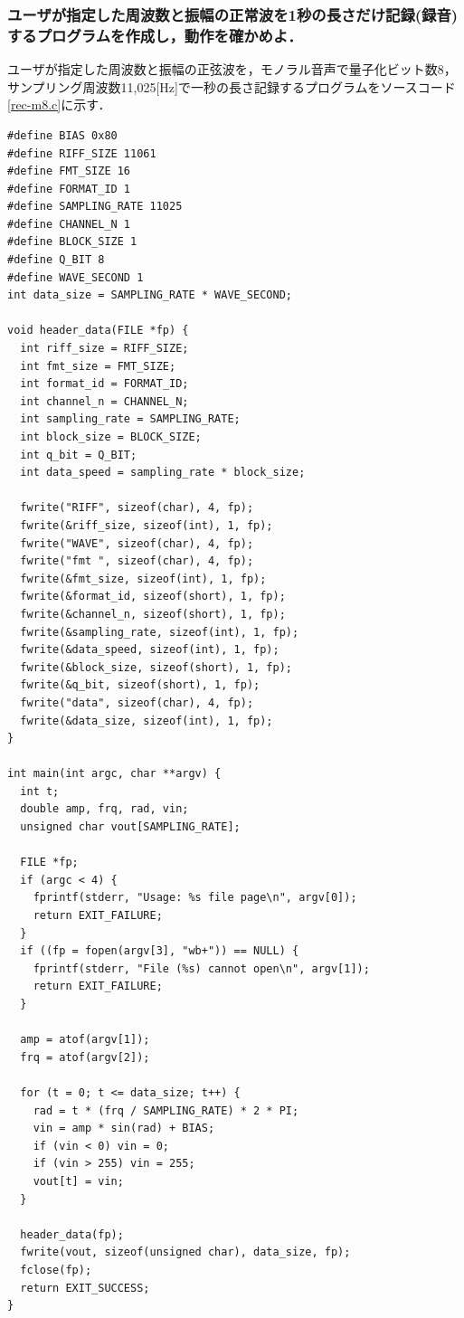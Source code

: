 \documentclass[titlepage]{jarticle}
\begin{document}
\subsubsection{ユーザが指定した周波数と振幅の正常波を1秒の長さだけ記録(録音)するプログラムを作成し，動作を確かめよ．}
ユーザが指定した周波数と振幅の正弦波を，モノラル音声で量子化ビット数8，サンプリング周波数11,025[Hz]で一秒の長さ記録するプログラムをソースコード\ref{rec-m8.c}に示す．
\begin{lstlisting}[caption=rec-m8.c,label=rec-m8.c]
#define BIAS 0x80
#define RIFF_SIZE 11061
#define FMT_SIZE 16
#define FORMAT_ID 1
#define SAMPLING_RATE 11025
#define CHANNEL_N 1
#define BLOCK_SIZE 1
#define Q_BIT 8
#define WAVE_SECOND 1
int data_size = SAMPLING_RATE * WAVE_SECOND;

void header_data(FILE *fp) {
  int riff_size = RIFF_SIZE;
  int fmt_size = FMT_SIZE;
  int format_id = FORMAT_ID;
  int channel_n = CHANNEL_N;
  int sampling_rate = SAMPLING_RATE;
  int block_size = BLOCK_SIZE;
  int q_bit = Q_BIT;
  int data_speed = sampling_rate * block_size;

  fwrite("RIFF", sizeof(char), 4, fp);
  fwrite(&riff_size, sizeof(int), 1, fp);
  fwrite("WAVE", sizeof(char), 4, fp);
  fwrite("fmt ", sizeof(char), 4, fp);
  fwrite(&fmt_size, sizeof(int), 1, fp);
  fwrite(&format_id, sizeof(short), 1, fp);
  fwrite(&channel_n, sizeof(short), 1, fp);
  fwrite(&sampling_rate, sizeof(int), 1, fp);
  fwrite(&data_speed, sizeof(int), 1, fp);
  fwrite(&block_size, sizeof(short), 1, fp);
  fwrite(&q_bit, sizeof(short), 1, fp);
  fwrite("data", sizeof(char), 4, fp);
  fwrite(&data_size, sizeof(int), 1, fp);
}

int main(int argc, char **argv) {
  int t;
  double amp, frq, rad, vin;
  unsigned char vout[SAMPLING_RATE];

  FILE *fp;
  if (argc < 4) {
    fprintf(stderr, "Usage: %s file page\n", argv[0]);
    return EXIT_FAILURE;
  }
  if ((fp = fopen(argv[3], "wb+")) == NULL) {
    fprintf(stderr, "File (%s) cannot open\n", argv[1]);
    return EXIT_FAILURE;
  }

  amp = atof(argv[1]);
  frq = atof(argv[2]);

  for (t = 0; t <= data_size; t++) {
    rad = t * (frq / SAMPLING_RATE) * 2 * PI;
    vin = amp * sin(rad) + BIAS;
    if (vin < 0) vin = 0;
    if (vin > 255) vin = 255;
    vout[t] = vin;
  }

  header_data(fp);
  fwrite(vout, sizeof(unsigned char), data_size, fp);
  fclose(fp);
  return EXIT_SUCCESS;
}
    \end{lstlisting}
\end{document}
